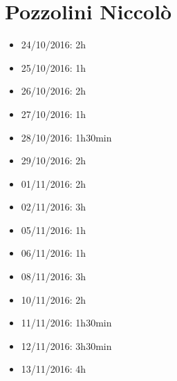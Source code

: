\section*{Pozzolini Niccolò}
\begin{itemize}
	\item 24/10/2016: 2h
	\item 25/10/2016: 1h
	\item 26/10/2016: 2h
	\item 27/10/2016: 1h
	\item 28/10/2016: 1h30min
	\item 29/10/2016: 2h
	\item 01/11/2016: 2h
	\item 02/11/2016: 3h
	\item 05/11/2016: 1h
	\item 06/11/2016: 1h
	\item 08/11/2016: 3h
	\item 10/11/2016: 2h
	\item 11/11/2016: 1h30min
	\item 12/11/2016: 3h30min
	\item 13/11/2016: 4h
\end{itemize}